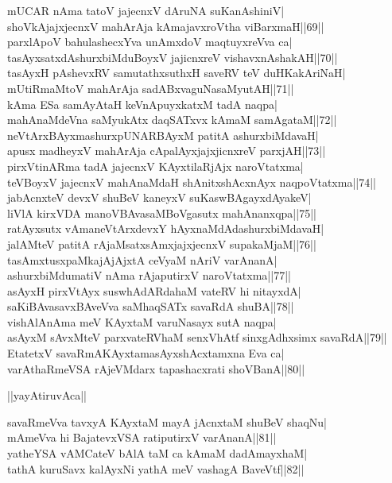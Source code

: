 \documentclass{article}
\begin{document}
mUCAR nAma tatoV jajecnxV dAruNA suKanAshiniV|\\
shoVkAjajxjecnxV mahArAja kAmajavxroVtha viBarxmaH||69||\\
parxlApoV bahulashecxYva unAmxdoV maqtuyxreVva ca|\\
tasAyxsatxdAshurxbiMduBoyxV jajicnxreV vishavxnAshakAH||70||\\
tasAyxH pAshevxRV samutathxsuthxH saveRV teV duHKakAriNaH|\\
mUtiRmaMtoV mahArAja sadABxvaguNasaMyutAH||71||\\
kAma ESa samAyAtaH keVnApuyxkatxM tadA naqpa|\\
mahAnaMdeVna saMyukAtx daqSATxvx kAmaM samAgataM||72||\\
neVtArxBAyxmashurxpUNARBAyxM patitA ashurxbiMdavaH|\\
apusx madheyxV mahArAja cApalAyxjajxjicnxreV parxjAH||73||\\
pirxVtinARma tadA jajecnxV KAyxtilaRjAjx naroVtatxma|\\
teVBoyxV jajecnxV mahAnaMdaH shAnitxshAcxnAyx naqpoVtatxma||74||\\
jabAcnxteV devxV shuBeV kaneyxV suKaswBAgayxdAyakeV|\\
liVlA kirxVDA manoVBAvasaMBoVgasutx mahAnanxqpa||75||\\
ratAyxsutx vAmaneVtArxdevxY hAyxnaMdAdashurxbiMdavaH|\\
jalAMteV patitA rAjaMsatxsAmxjajxjecnxV supakaMjaM||76||\\
tasAmxtusxpaMkajAjAjxtA ceVyaM nAriV varAnanA|\\
ashurxbiMdumatiV nAma rAjaputirxV naroVtatxma||77||\\
asAyxH pirxVtAyx suswhAdARdahaM vateRV hi nitayxdA|\\
saKiBAvasavxBAveVva saMhaqSATx savaRdA shuBA||78||\\
vishAlAnAma meV KAyxtaM varuNasayx sutA naqpa|\\
asAyxM sAvxMteV parxvateRVhaM senxVhAtf sinxgAdhxsimx savaRdA||79||\\
EtatetxV savaRmAKAyxtamasAyxshAcxtamxna Eva ca|\\
varAthaRmeVSA rAjeVMdarx tapashacxrati shoVBanA||80||\\

\begin{center}
||yayAtiruvAca||
\end{center}

savaRmeVva tavxyA KAyxtaM mayA jAcnxtaM shuBeV shaqNu|\\
mAmeVva hi BajatevxVSA ratiputirxV varAnanA||81||\\
yatheYSA vAMCateV bAlA taM ca kAmaM dadAmayxhaM|\\
tathA kuruSavx kalAyxNi yathA meV vashagA BaveVtf||82||\\
\end{document}
